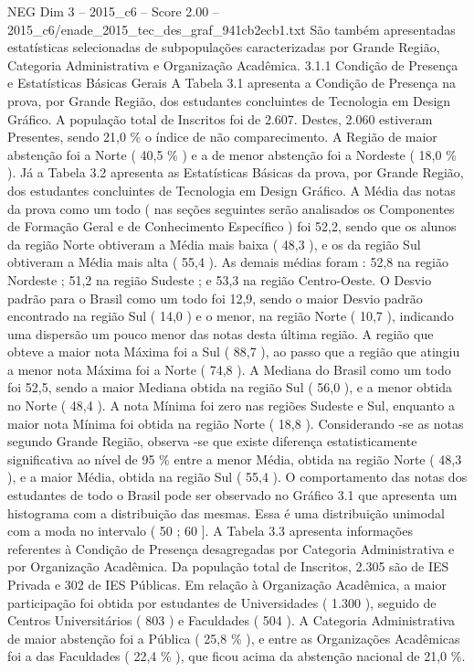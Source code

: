 \begin{textsample}{NEG Dim 3 – 2015\_c6 – Score 2.00 – 2015\_c6/enade\_2015\_tec\_des\_graf\_941cb2ecb1.txt}
São também apresentadas estatísticas selecionadas de subpopulações caracterizadas por Grande Região, Categoria Administrativa e Organização Acadêmica. 3.1.1 Condição de Presença e Estatísticas Básicas Gerais A Tabela 3.1 apresenta a Condição de Presença na prova, por Grande Região, dos estudantes concluintes de Tecnologia em Design Gráfico.
A população total de Inscritos foi de 2.607.
Destes, 2.060 estiveram Presentes, sendo 21,0 \% o índice de não comparecimento.
A Região de maior abstenção foi a Norte ( 40,5 \% ) e a de menor abstenção foi a Nordeste ( 18,0 \% ).
Já a Tabela 3.2 apresenta as Estatísticas Básicas da prova, por Grande Região, dos estudantes concluintes de Tecnologia em Design Gráfico.
A Média das notas da prova como um todo ( nas seções seguintes serão analisados os Componentes de Formação Geral e de Conhecimento Específico ) foi 52,2, sendo que os alunos da região Norte obtiveram a Média mais baixa ( 48,3 ), e os da região Sul obtiveram a Média mais alta ( 55,4 ).
As demais médias foram : 52,8 na região Nordeste ; 51,2 na região Sudeste ; e 53,3 na região Centro-Oeste.
O Desvio padrão para o Brasil como um todo foi 12,9, sendo o maior Desvio padrão encontrado na região Sul ( 14,0 ) e o menor, na região Norte ( 10,7 ), indicando uma dispersão um pouco menor das notas desta última região.
A região que obteve a maior nota Máxima foi a Sul ( 88,7 ), ao passo que a região que atingiu a menor nota Máxima foi a Norte ( 74,8 ).
A Mediana do Brasil como um todo foi 52,5, sendo a maior Mediana obtida na região Sul ( 56,0 ), e a menor obtida no Norte ( 48,4 ).
A nota Mínima foi zero nas regiões Sudeste e Sul, enquanto a maior nota Mínima foi obtida na região Norte ( 18,8 ).
Considerando -se as notas segundo Grande Região, observa -se que existe diferença estatisticamente significativa ao nível de 95 \% entre a menor Média, obtida na região Norte ( 48,3 ), e a maior Média, obtida na região Sul ( 55,4 ).
O comportamento das notas dos estudantes de todo o Brasil pode ser observado no Gráfico 3.1 que apresenta um histograma com a distribuição das mesmas.
Essa é uma distribuição unimodal com a moda no intervalo ( 50 ; 60 ].
A Tabela 3.3 apresenta informações referentes à Condição de Presença desagregadas por Categoria Administrativa e por Organização Acadêmica.
Da população total de Inscritos, 2.305 são de IES Privada e 302 de IES Públicas.
Em relação à Organização Acadêmica, a maior participação foi obtida por estudantes de Universidades ( 1.300 ), seguido de Centros Universitários ( 803 ) e Faculdades ( 504 ).
A Categoria Administrativa de maior abstenção foi a Pública ( 25,8 \% ), e entre as Organizações Acadêmicas foi a das Faculdades ( 22,4 \% ), que ficou acima da abstenção nacional de 21,0 \%.

\end{textsample}
